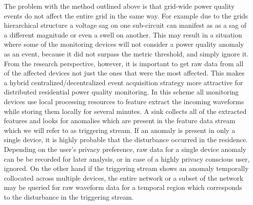 The problem with the method outlined above is that grid-wide power quality events do not affect the entire grid in the same way. For example due to the grids hierarchical structure a voltage sag on one sub-circuit can manifest as as a sag of a different magnitude or even a swell on another.\cite{kahle2016power} This may result in a situation where some of the monitoring devices will not consider a power quality anomaly as an event, because it did not surpass the metric threshold, and simply ignore it. From the research perspective, however, it is important to get raw data from all of the affected devices not just the ones that were the most affected. This makes a hybrid centralized/decentralized event acquisition strategy more attractive for distributed residential power quality monitoring. In this scheme all monitoring devices use local processing resources to feature extract the incoming waveforms while storing them locally for several minutes. A sink collects all of the extracted features and looks for anomalies which are present in the feature data stream which we will refer to as triggering stream. If an anomaly is present in only a single device, it is highly probable that the disturbance occurred in the residence. Depending on the user's privacy preference, raw data for a single device anomaly can be be recorded for later analysis, or in case of a highly privacy conscious user, ignored. On the other hand if the triggering stream shows an anomaly temporally collocated across multiple devices, the entire network or a subset of the network may be queried for raw waveform data for a temporal region which corresponds to the disturbance in the triggering stream.

